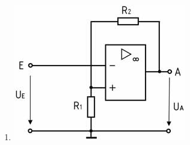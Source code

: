 \documentclass[8pt]{article}
\begin{document}
\begin{enumerate}
\begin{enumerate}[nolistsep,label=\Alph*]
{\begin{enumerate}[nolistsep,label=\Alph*]
\begin{enumerate}[nolistsep,label=\Alph*]
\begin{center}
\begin{minipage}{\linewidth}
	\end{minipage}
\end{center}
\item
\begin{center}
	\begin{minipage}{\linewidth}
		\centering
		\includegraphics[scale=1.0]{pics/tc716_d.jpg}
	\end{minipage}
\end{center}
\end{enumerate}


\end{enumerate}}
\end{enumerate}
\end{enumerate}
\end{document}
